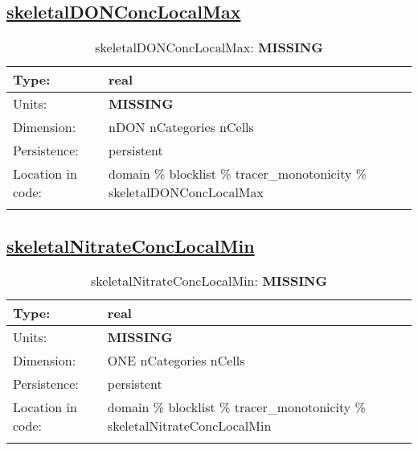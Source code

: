 \subsection[skeletalDONConcLocalMax]{\hyperref[sec:var_tab_tracer_monotonicity]{skeletalDONConcLocalMax}}
\label{subsec:var_sec_tracer_monotonicity_skeletalDONConcLocalMax}
\begin{center}
\begin{longtable}{| p{2.0in} | p{4.0in} |}
        \hline 
        Type: & real \\
        \hline 
        Units: & {\bf \color{red} MISSING} \\
        \hline 
        Dimension: & nDON nCategories nCells \\
        \hline 
        Persistence: & persistent \\
        \hline 
         Location in code: & domain \% blocklist \% tracer\_monotonicity \% skeletalDONConcLocalMax \\
         \hline 
    \caption{skeletalDONConcLocalMax: {\bf \color{red} MISSING}}
\end{longtable}
\end{center}
\subsection[skeletalNitrateConcLocalMin]{\hyperref[sec:var_tab_tracer_monotonicity]{skeletalNitrateConcLocalMin}}
\label{subsec:var_sec_tracer_monotonicity_skeletalNitrateConcLocalMin}
\begin{center}
\begin{longtable}{| p{2.0in} | p{4.0in} |}
        \hline 
        Type: & real \\
        \hline 
        Units: & {\bf \color{red} MISSING} \\
        \hline 
        Dimension: & ONE nCategories nCells \\
        \hline 
        Persistence: & persistent \\
        \hline 
         Location in code: & domain \% blocklist \% tracer\_monotonicity \% skeletalNitrateConcLocalMin \\
         \hline 
    \caption{skeletalNitrateConcLocalMin: {\bf \color{red} MISSING}}
\end{longtable}
\end{center}
